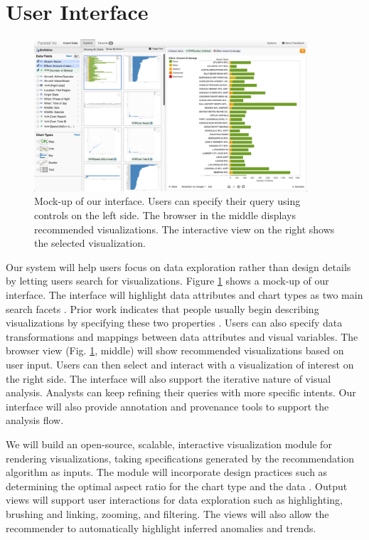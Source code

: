 \section*{User Interface}

\begingroup
\setlength{\columnsep}{16pt}

\begin{figure}
\vspace{-0.3in}
\begin{center}
\includegraphics[width=4in]{ui.png}

\caption{Mock-up of our interface. Users can specify their query using controls on the left side.  The browser in the middle displays recommended visualizations.  The interactive view on the right shows the selected visualization.}
\label{fig:ui}
\end{center}
\vspace{-0.3in}
\end{figure}

Our system will help users focus on data exploration rather than design details by letting users search for visualizations.
Figure \ref{fig:ui} shows a mock-up of our interface. The interface will highlight data attributes and chart types as two main search facets \cite{yee:faceted}. Prior work indicates that people usually begin describing visualizations by specifying these two properties \cite{grammel:novice}.  Users can also specify data transformations and mappings between data attributes and visual variables. The browser view (Fig. \ref{fig:ui}, middle) will show recommended visualizations based on user input.  Users can then select and interact with a visualization of interest on the right side. The interface will also support the iterative nature of visual analysis.  Analysts can keep refining their queries with more specific intents.  Our interface will also provide annotation and provenance tools to support the analysis flow.


\endgroup

We will build an open-source, scalable, interactive visualization module for rendering visualizations, taking specifications generated by the recommendation algorithm as inputs. The module will incorporate design practices such as determining the optimal aspect ratio for the chart type and the data \cite{talbot:arc}.  Output views will support user interactions \cite{heer:dynamics} for data exploration such as highlighting, brushing and linking, zooming, and filtering. The views will also allow the recommender to automatically highlight inferred anomalies and trends.